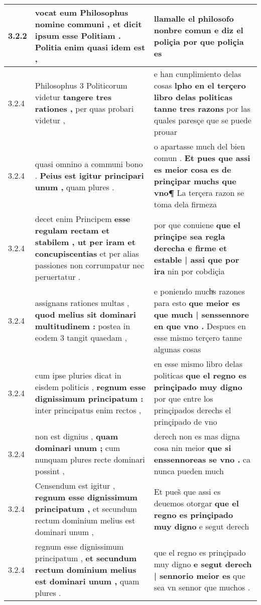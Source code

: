 \begin{tabular}{|p{1cm}|p{6.5cm}|p{6.5cm}|}
3.2.2 & vocat eum Philosophus nomine communi , \textbf{ et dicit ipsum esse Politiam . } Politia enim quasi idem est , & llamalle el philosofo nonbre comun \textbf{ e diz el poliçia } por que poliçia es \\\hline
3.2.4 & Philosophus 3 Politicorum videtur \textbf{ tangere tres rationes , } per quas probari videtur , & e han cunplimiento delas cosas \textbf{ lpho en el terçero libro delas politicas tanne tres razons } por las quales paresçe que se puede prouar \\\hline
3.2.4 & quasi omnino a communi bono . \textbf{ Peius est igitur principari unum , } quam plures . & o apartasse much del bien comun . \textbf{ Et pues que assi es meior cosa es de prinçipar muchs que vno¶ } La terçera razon se toma dela firmeza \\\hline
3.2.4 & decet enim Principem \textbf{ esse regulam rectam et stabilem , ut per iram et concupiscentias } et per alias passiones non corrumpatur nec peruertatur . & por que conuiene \textbf{ que el prinçipe sea regla derecha e firme et estable | assi que por ira } nin por cobdiçia \\\hline
3.2.4 & assignans rationes multas , \textbf{ quod melius sit dominari multitudinem : } postea in eodem 3 tangit quaedam , & e poniendo muchͣs razones para esto \textbf{ que meior es que much | senssennore en que vno . } Despues en esse mismo terçero tanne algunas cosas \\\hline
3.2.4 & cum ipse pluries dicat in eisdem politicis , \textbf{ regnum esse dignissimum principatum : } inter principatus enim rectos , & en esse mismo libro delas politicas \textbf{ que el regno es prinçipado muy digno } por que entre los prinçipados derechs el prinçipado de vno \\\hline
3.2.4 & non est dignius , \textbf{ quam dominari unum ; } cum nunquam plures recte dominari possint , & derech non es mas digna cosa nin meior \textbf{ que si enssennoreas se vno . } ca nunca pueden much \\\hline
3.2.4 & Censendum est igitur , \textbf{ regnum esse dignissimum principatum , } et secundum rectum dominium melius est dominari unum , & Et pues̃ que assi es deuemos otorgar \textbf{ que el regno es prinçipado muy digno } e segut derech \\\hline
3.2.4 & regnum esse dignissimum principatum , \textbf{ et secundum rectum dominium melius est dominari unum , } quam plures . & que el regno es prinçipado muy digno \textbf{ e segut derech | sennorio meior es } que sea vn sennor que muchos . \\\hline

\end{tabular}

